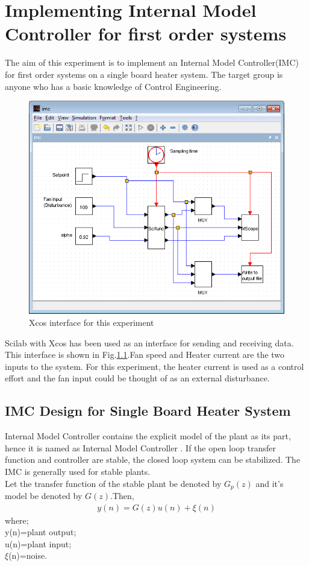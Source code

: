 \chapter{Implementing Internal Model Controller for first order systems}
The aim of this experiment is to implement an Internal Model Controller(IMC) for first order systems on a single board heater system. The target group is anyone who has a basic knowledge of Control Engineering.
\begin{figure}
	\centering
		\includegraphics[width=\linewidth]{IMC/imc_xcos.png}
	\caption{Xcos interface for this experiment}
	\label{Xcos_imc}
\end{figure}
Scilab with Xcos has been used as an interface for sending and receiving data. This interface is shown in Fig.\ref{Xcos_imc}.Fan speed and Heater current are the two inputs to the system. For this experiment, the heater current is used as a control effort and the fan input could be thought of as an external disturbance.

\section{IMC Design for Single Board Heater System}
Internal Model Controller contains the explicit model of the plant as its part, hence it is named as Internal Model Controller \cite{kmm09}. 
If the open loop transfer function and controller are stable, the closed loop system can be stabilized. The IMC is generally used for stable plants.\\

Let the transfer function of the stable plant be denoted by $G_p (z)$ and it's model be denoted by $G(z)$.Then,
\begin{align}
y(n)=G(z)u(n)+\xi(n) 
\end{align}
where; \\
y(n)=plant output;\\
u(n)=plant input;\\
$\xi$(n)=noise.
      
